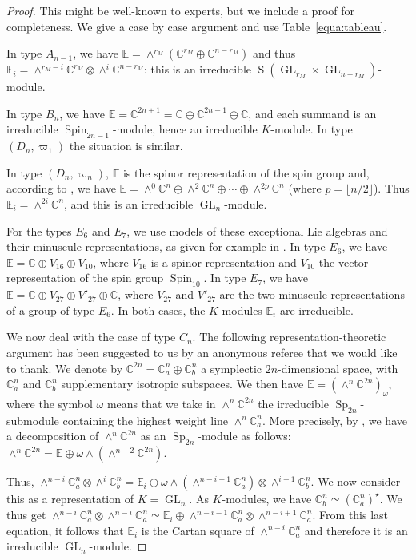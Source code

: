 \documentclass[10pt]{amsart}
\newcommand{\citestar}[3]{\cite[#3]{#1}}
\theoremstyle{plain}
\theoremstyle{definition}
\DeclareMathOperator{\GL}{GL}
\DeclareMathOperator{\rS}{S}
\DeclareMathOperator{\Sp}{Sp}
\DeclareMathOperator{\Spin}{Spin}
\newcommand{\bC}{\mathbb{C}}
\newcommand{\bE}{\mathbb{E}}
\newcommand{\rkm}{{r_M}}
\begin{document}
\begin{proof}
This might be well-known to experts, but we include a proof for completeness.
We give a case by case argument and use Table~\ref{equa:tableau}.

In type $A_{n-1}$, we have $\bE = \wedge^\rkm (\bC^\rkm \oplus \bC^{n-\rkm})$
and thus $\bE_i = \wedge^{\rkm-i} \bC^\rkm \otimes \wedge^i \bC^{n-\rkm}$: this is an irreducible $\rS(\GL_\rkm
\times \GL_{n-\rkm})$-module.

In type $B_n$, we have $\bE = \bC^{2n+1} = \bC \oplus \bC^{2n-1} \oplus \bC$,
and each summand is an irreducible $\Spin_{2n-1}$-module, hence an irreducible $K$-module.
In type $(D_n,\varpi_1)$ the situation is similar.

In type $(D_n,\varpi_n)$, $\bE$ is the spinor
representation of the spin group and, according to \cite{chevalley}, we have $\bE = \wedge^0 \bC^n
\oplus \wedge^2 \bC^n \oplus \cdots \oplus \wedge^{2p} \bC^n$ (where $p=\lfloor n/2\rfloor $). Thus $\bE_i =
\wedge^{2i} \bC^n$, and this is an irreducible $\GL_n$-module.

For the types $E_6$ and $E_7$, we use
models of these exceptional Lie algebras and their minuscule representations, as given for example
in \cite{manivel}. In type $E_6$, we have $\bE = \bC \oplus V_{16} \oplus V_{10}$, where $V_{16}$ is
a spinor representation and $V_{10}$ the vector representation of the spin group $\Spin_{10}$. In
type $E_7$, we have $\bE = \bC \oplus V_{27} \oplus V'_{27} \oplus \bC$, where $V_{27}$ and $V'_{27}$
are the two minuscule representations of a group of type $E_6$. In both cases, the $K$-modules
$\bE_i$ are irreducible.

We now deal with the case of type $C_n$. The following representation-theoretic
argument has been suggested to us by an anonymous referee that we would like to thank.
We denote by $\bC^{2n} = \bC^n_a \oplus \bC^n_b$ a symplectic $2n$-dimensional space, with $\bC^n_a$ and
$\bC^n_b$ supplementary isotropic subspaces. We then have
$\bE=\left (\wedge^n \bC^{2n} \right)_\omega$,
where the symbol $\omega$ means that we take in $\wedge^n \bC^{2n}$ the irreducible
$\Sp_{2n}$-submodule containing the highest weight line $\wedge^n \bC^n_a$.
More precisely, by \citestar{fulton-harris}*{Th.\,17.5}, we have
a decomposition of $\wedge^n \bC^{2n}$ as an $\Sp_{2n}$-module as follows:
$\wedge^n \bC^{2n} = \bE \oplus \omega \wedge (\wedge^{n-2} \bC^{2n})$.

Thus,
$\wedge^{n-i} \bC^n_a \otimes \wedge^i \bC^n_b =
\bE_i \oplus \omega \wedge (\wedge^{n-i-1} \bC^n_a) \otimes \wedge^{i-1} \bC^n_b.$
We now consider this as a representation of $K=\GL_n$. As $K$-modules, we have $\bC^n_b \simeq {(\bC^n_a)}^\star$.
We thus get
$\wedge^{n-i} \bC^n_a \otimes \wedge^{n-i} \bC^n_a \simeq
\bE_i \oplus \wedge^{n-i-1} \bC^n_a \otimes \wedge^{n-i+1} \bC^n_a.$
From this last equation, it follows that $\bE_i$ is the Cartan square of $\wedge^{n-i} \bC^n_a$ and therefore
it is an irreducible $\GL_n$-module.
\end{proof}
\end{document}
